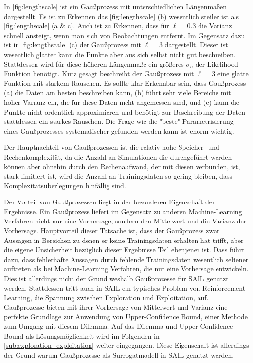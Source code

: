 In \cref{fig:lengthscale} ist ein Gaußprozess mit unterschiedlichen Längenmaßen dargestellt.
Es ist zu Erkennen das \cref{fig:lengthscale} (b) wesentlich steiler ist als \cref{fig:lengthscale} (a \& c).
Auch ist zu Erkennen, dass für $\ell=0.3$ die Varianz schnell ansteigt, wenn man sich von Beobachtungen entfernt.
Im Gegensatz dazu ist in \cref{fig:lengthscale} (c) der Gaußprozess mit $\ell = 3$ dargestellt. Dieser ist wesentlich glatter kann die Punkte aber aus sich selbst nicht gut beschreiben. 
Stattdessen wird für diese höheren Längenmaße ein größeres $\sigma_n$ der Likelihood-Funktion benötigt. 
Kurz gesagt beschreibt der Gaußprozess mit $\ell=3$ eine glatte Funktion mit starkem Rauschen.
Es sollte klar Erkennbar sein, dass Gaußprozess (a) die Daten am besten beschreiben kann, (b) führt sehr viele Bereiche mit hoher Varianz ein, die für diese Daten nicht angemessen sind, und (c) kann die Punkte nicht ordentlich approximieren und benötigt zur Beschreibung der Daten stattdessen ein starkes Rauschen.
Die Frage wie die "beste" Parametrisierung eines Gaußprozesses systematischer gefunden werden kann ist enorm wichtig.


Der Hauptnachteil von Gaußprozessen ist die relativ hohe Speicher- und Rechenkomplexität, da die Anzahl an Simulationen die durchgeführt werden können aber ohnehin durch den Rechenaufwand, der mit diesen verbunden, ist, stark limitiert ist, wird die Anzahl an Trainingsdaten so gering bleiben, dass Komplexitätsüberlegungen hinfällig sind.

Der Vorteil von Gaußprozessen liegt in der besonderen Eigenschaft der Ergebnisse.
Ein Gaußprozess liefert im Gegensatz zu anderen Machine-Learning Verfahren nicht nur eine Vorhersage, sondern den Mittelwert und die Varianz der Vorhersage.
Hauptvorteil dieser Tatsache ist, dass der Gaußprozess zwar Aussagen in Bereichen zu denen er keine Trainingsdaten erhalten hat trifft, aber die eigene Unsicherheit bezüglich dieser Ergebnisse Teil ebenjener ist.
Dass führt dazu, dass fehlerhafte Aussagen durch fehlende Trainingsdaten wesentlich seltener auftreten als bei Machine-Learning Verfahren, die nur eine Vorhersage entwickeln.
Dies ist allerdings nicht der Grund weshalb Gaußprozesse für SAIL genutzt werden.
Stattdessen tritt auch in SAIL ein typisches Problem von Reinforcement Learning, die Spannung zwischen Exploration und Exploitation, auf.
Gaußprozesse bieten mit ihrer Vorhersage von Mittelwert und Varianz eine perfekte Grundlage zur Anwendung von Upper-Confidence Bound, einer Methode zum Umgang mit diesem Dilemma.
Auf das Dilemma und Upper-Confidence-Bound als Lösungsmöglichkeit wird im Folgenden in \ref{sub:exploration_exploitation} weiter eingegangen.
Diese Eigenschaft ist allerdings der Grund warum Gaußprozesse als Surrogatmodell in SAIL genutzt werden.

